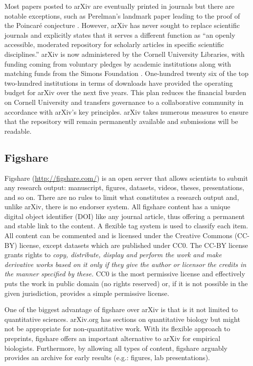 \documentclass[letterpaper,twocolumn,superscriptaddress,showkeys,longbibliography]{revtex4-1}
\begin{document}
Most papers posted to arXiv are eventually printed in journals but there are
notable exceptions, such as Perelman's landmark paper leading to the proof of
the Poincar\'{e} conjecture \cite{2002math.....11159P}.  However, arXiv has
never sought to replace scientific journals and explicitly states that it serves
a different function as ``an openly accessible, moderated repository for
scholarly articles in specific scientific disciplines.'' arXiv is now
administered by the Cornell University Libraries, with funding coming from
voluntary pledges by academic institutions along with matching funds from the
Simons Foundation \cite{arxiv_future}.  One-hundred twenty six of the top
two-hundred institutions in terms of downloads have provided the operating
budget for arXiv over the next five years.  This plan reduces the financial
burden on Cornell University and transfers governance to a collaborative
community in accordance with arXiv's key principles.  arXiv takes numerous
measures to ensure that the repository will remain permanently available and
submissions will be readable.

\subsection{Figshare}

Figshare (\href{http://figshare.com/}{http://figshare.com/}) is an open server
that allows scientists to submit any research output: manuscript, figures,
datasets, videos, theses, presentations, and so on. There are no rules to limit
what constitutes a research output and, unlike arXiv, there is no endorser
system. All figshare content has a unique digital object identifier (DOI) like
any journal article, thus offering a permanent and stable link to the content.
A flexible tag system is used to classify each item. All content can be
commented and is licensed under the Creative Commons (CC-BY) license, except
datasets which are published under CC0. The CC-BY license grants rights to
\emph{copy, distribute, display and perform the work and make derivative works
based on it only if they give the author or licensor the credits in the manner
specified by these.}  CC0 is the most permissive license and effectively puts
the work in public domain (no rights reserved) or, if it is not possible in the
given jurisdiction, provides a simple permissive license.

One of the biggest advantage of figshare over arXiv is that is it not limited to
quantitative sciences. arXiv.org has sections on quantitative biology but might
not be appropriate for non-quantitative work. With its flexible approach to
preprints, figshare offers an important alternative to arXiv for empirical
biologists. Furthermore, by allowing all types of content, figshare arguably
provides an archive for early results (e.g.: figures, lab presentations).
\end{document}
